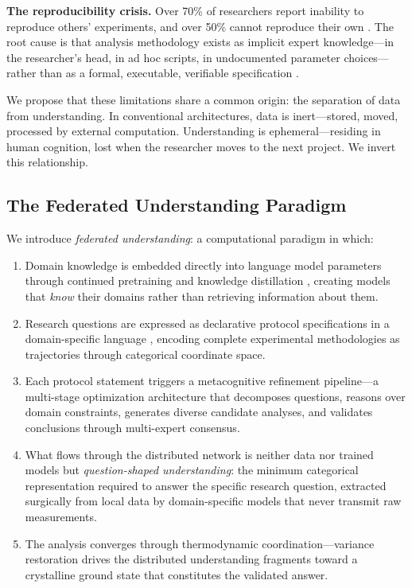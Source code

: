 \documentclass[10pt,twocolumn]{article}
\theoremstyle{definition}
\theoremstyle{remark}
\begin{document}
\textbf{The reproducibility crisis.} Over 70\% of researchers report inability to reproduce others' experiments, and over 50\% cannot reproduce their own \cite{baker2016}. The root cause is that analysis methodology exists as implicit expert knowledge---in the researcher's head, in ad hoc scripts, in undocumented parameter choices---rather than as a formal, executable, verifiable specification \cite{stodden2014}.

We propose that these limitations share a common origin: the separation of data from understanding. In conventional architectures, data is inert---stored, moved, processed by external computation. Understanding is ephemeral---residing in human cognition, lost when the researcher moves to the next project. We invert this relationship.

\subsection{The Federated Understanding Paradigm}

We introduce \emph{federated understanding}: a computational paradigm in which:

\begin{enumerate}[nosep]
\item Domain knowledge is embedded directly into language model parameters through continued pretraining and knowledge distillation \cite{hinton2015,gururangan2020}, creating models that \emph{know} their domains rather than retrieving information about them.

\item Research questions are expressed as declarative protocol specifications in a domain-specific language \cite{fowler2010}, encoding complete experimental methodologies as trajectories through categorical coordinate space.

\item Each protocol statement triggers a metacognitive refinement pipeline---a multi-stage optimization architecture \cite{yao2023tree,madaan2023self} that decomposes questions, reasons over domain constraints, generates diverse candidate analyses, and validates conclusions through multi-expert consensus.

\item What flows through the distributed network is neither data nor trained models but \emph{question-shaped understanding}: the minimum categorical representation required to answer the specific research question, extracted surgically from local data by domain-specific models that never transmit raw measurements.

\item The analysis converges through thermodynamic coordination---variance restoration drives the distributed understanding fragments toward a crystalline ground state that constitutes the validated answer.
\end{enumerate}
\end{document}
